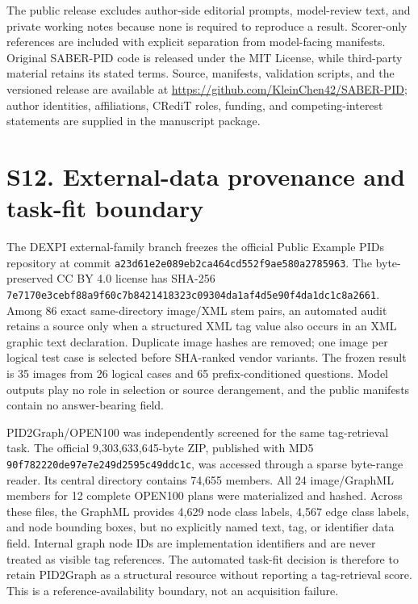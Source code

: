 \documentclass[11pt]{article}
\begin{document}
The public release excludes author-side editorial prompts, model-review text,
and private working notes because none is required to reproduce a result.
Scorer-only references are included with explicit separation from model-facing
manifests. Original SABER-PID code is released under the MIT License, while
third-party material retains its stated terms. Source, manifests, validation
scripts, and the versioned release are available at
\url{https://github.com/KleinChen42/SABER-PID}; author identities,
affiliations, CRediT roles, funding, and competing-interest statements are
supplied in the manuscript package.

\section*{S12. External-data provenance and task-fit boundary}

The DEXPI external-family branch freezes the official Public Example PIDs
repository at commit
\texttt{a23d61e2e089eb2ca464cd552f9ae580a2785963}. The byte-preserved CC BY 4.0
license has SHA-256
\texttt{7e7170e3cebf88a9f60c7b8421418323c09304da1af4d5e90f4da1dc1c8a2661}.
Among 86 exact same-directory image/XML stem pairs, an automated audit retains
a source only when a structured XML tag value also occurs in an XML graphic
text declaration. Duplicate image hashes are removed; one image per logical
test case is selected before SHA-ranked vendor variants. The frozen result is
35 images from 26 logical cases and 65 prefix-conditioned questions. Model
outputs play no role in selection or source derangement, and the public
manifests contain no answer-bearing field.

PID2Graph/OPEN100 was independently screened for the same tag-retrieval task.
The official 9,303,633,645-byte ZIP, published with MD5
\texttt{90f782220de97e7e249d2595c49ddc1c}, was accessed through a sparse
byte-range reader. Its central directory contains 74,655 members. All 24
image/GraphML members for 12 complete OPEN100 plans were materialized and
hashed. Across these files, the GraphML provides 4,629 node class labels,
4,567 edge class labels, and node bounding boxes, but no explicitly named
text, tag, or identifier data field. Internal graph node IDs are implementation
identifiers and are never treated as visible tag references. The automated
task-fit decision is therefore to retain PID2Graph as a structural resource
without reporting a tag-retrieval score. This is a reference-availability
boundary, not an acquisition failure.
\end{document}
